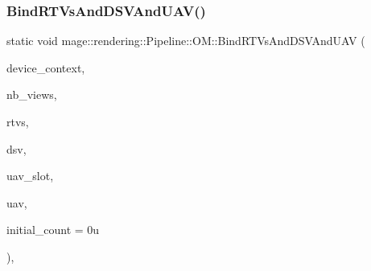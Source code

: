 \hypertarget{structmage_1_1rendering_1_1_pipeline_1_1_o_m_ad1f9cf7c290cb8f2135a21f5d4f25473}{}\label{structmage_1_1rendering_1_1_pipeline_1_1_o_m_ad1f9cf7c290cb8f2135a21f5d4f25473} 
\subsubsection{\texorpdfstring{Bind\+R\+T\+Vs\+And\+D\+S\+V\+And\+U\+A\+V()}{BindRTVsAndDSVAndUAV()}}
{\footnotesize\ttfamily static void mage\+::rendering\+::\+Pipeline\+::\+O\+M\+::\+Bind\+R\+T\+Vs\+And\+D\+S\+V\+And\+U\+AV (\begin{DoxyParamCaption}\item[{I\+D3\+D11\+Device\+Context \&}]{device\+\_\+context,  }\item[{\hyperlink{namespacemage_a41c104c036fba3756a74e19f793eeaa1}{U32}}]{nb\+\_\+views,  }\item[{I\+D3\+D11\+Render\+Target\+View $\ast$const $\ast$}]{rtvs,  }\item[{I\+D3\+D11\+Depth\+Stencil\+View $\ast$}]{dsv,  }\item[{\hyperlink{namespacemage_a41c104c036fba3756a74e19f793eeaa1}{U32}}]{uav\+\_\+slot,  }\item[{I\+D3\+D11\+Unordered\+Access\+View $\ast$}]{uav,  }\item[{\hyperlink{namespacemage_a41c104c036fba3756a74e19f793eeaa1}{U32}}]{initial\+\_\+count = {\ttfamily 0u} }\end{DoxyParamCaption})\hspace{0.3cm}{\ttfamily [static]}, {\ttfamily [noexcept]}}

\hypertarget{structmage_1_1rendering_1_1_pipeline_1_1_o_m_a7dc275c2961fa64bf20af9d24962ff8f}{}\label{structmage_1_1rendering_1_1_pipeline_1_1_o_m_a7dc275c2961fa64bf20af9d24962ff8f} 

